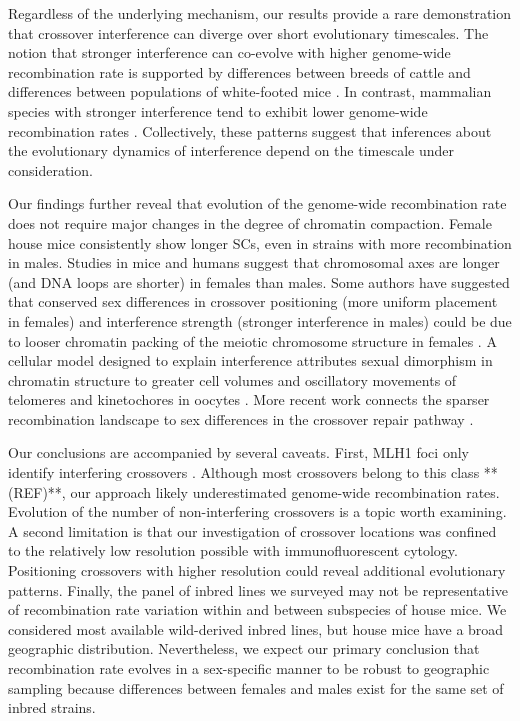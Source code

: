 \documentclass[9pt,lineno]{elife}
\begin{document}
Regardless of the underlying mechanism, our results provide a rare demonstration that crossover interference can diverge over short evolutionary timescales. The notion that stronger interference can co-evolve with higher genome-wide recombination rate is supported by differences between breeds of cattle \citep{ma2015_cattle} and differences between populations of white-footed mice \citep{peterson2019}. In contrast, mammalian species with stronger interference tend to exhibit lower genome-wide recombination rates \citep{segura2013, @ottoPaysuer2019}. Collectively, these patterns suggest that inferences about the evolutionary dynamics of interference depend on the timescale under consideration.

Our findings further reveal that evolution of the genome-wide recombination rate does not require major changes in the degree of chromatin compaction. Female house mice consistently show longer SCs, even in strains with more recombination in males. Studies in mice \citep{lynn2002, petkov2007} and humans \citep{gruhn2013, tease2004} suggest that chromosomal axes are longer (and DNA loops are shorter) in females than males. Some authors have suggested that conserved sex differences in crossover positioning (more uniform placement in females) and interference strength (stronger interference in males) could be due to looser chromatin packing of the meiotic chromosome structure in females \citep{haenel2018; @petkov2007}. A cellular model designed to explain interference attributes sexual dimorphism in chromatin structure to greater cell volumes and oscillatory movements of telomeres and kinetochores in oocytes \citep{@hulten2011_COM}. More recent work connects the sparser recombination landscape to sex differences in the crossover repair pathway \citep{wang2017inefficient}.

Our conclusions are accompanied by several caveats. First, MLH1 foci only identify interfering crossovers \citep{holloway2008mus81}. Although most crossovers belong to this class **(REF)**, our approach likely underestimated genome-wide recombination rates. Evolution of the number of non-interfering crossovers is a topic worth examining. A second limitation is that our investigation of crossover locations was confined to the relatively low resolution possible with immunofluorescent cytology. Positioning crossovers with higher resolution could reveal additional evolutionary patterns. Finally, the panel of inbred lines we surveyed may not be representative of recombination rate variation within and between subspecies of house mice. We considered most available wild-derived inbred lines, but house mice have a broad geographic distribution. Nevertheless, we expect our primary conclusion that recombination rate evolves in a sex-specific manner to be robust to geographic sampling because differences between females and males exist for the same set of inbred strains.
\end{document}
